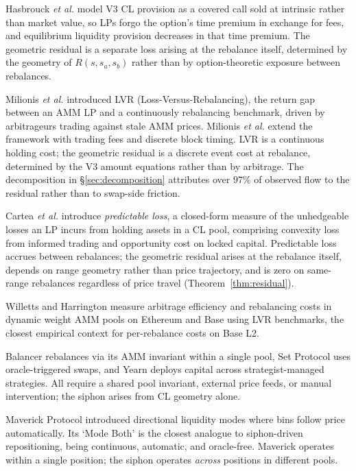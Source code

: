 \documentclass[11pt,a4paper]{article}
\begin{document}
Hasbrouck \emph{et al.}\cite{hasbrouck2025} model V3 CL provision as a covered call sold at intrinsic rather than market value, so LPs forgo the option's time premium in exchange for fees, and equilibrium liquidity provision decreases in that time premium. The geometric residual is a separate loss arising at the rebalance itself, determined by the geometry of $R(s, s_a, s_b)$ rather than by option-theoretic exposure between rebalances.

Milionis \emph{et al.}\cite{milionis2022b} introduced LVR (Loss-Versus-Rebalancing), the return gap between an AMM LP and a continuously rebalancing benchmark, driven by arbitrageurs trading against stale AMM prices. Milionis \emph{et al.}\cite{milionis2024} extend the framework with trading fees and discrete block timing. LVR is a continuous holding cost; the geometric residual is a discrete event cost at rebalance, determined by the V3 amount equations rather than by arbitrage. The decomposition in \S\ref{sec:decomposition} attributes over $97\%$ of observed flow to the residual rather than to swap-side friction.

Cartea \emph{et al.}\cite{cartea2024} introduce \emph{predictable loss}, a closed-form measure of the unhedgeable losses an LP incurs from holding assets in a CL pool, comprising convexity loss from informed trading and opportunity cost on locked capital. Predictable loss accrues between rebalances; the geometric residual arises at the rebalance itself, depends on range geometry rather than price trajectory, and is zero on same-range rebalances regardless of price travel (Theorem~\ref{thm:residual}).

Willetts and Harrington\cite{willetts2026} measure arbitrage efficiency and rebalancing costs in dynamic weight AMM pools on Ethereum and Base using LVR benchmarks, the closest empirical context for per-rebalance costs on Base L2.

Balancer \cite{martinelli2019} rebalances via its AMM invariant within a single pool, Set Protocol uses oracle-triggered swaps, and Yearn deploys capital across strategist-managed strategies. All require a shared pool invariant, external price feeds, or manual intervention; the siphon arises from CL geometry alone.

Maverick Protocol \cite{maverick2023} introduced directional liquidity modes where bins follow price automatically. Its `Mode Both' is the closest analogue to siphon-driven repositioning, being continuous, automatic, and oracle-free. Maverick operates within a single position; the siphon operates \emph{across} positions in different pools.
\end{document}
